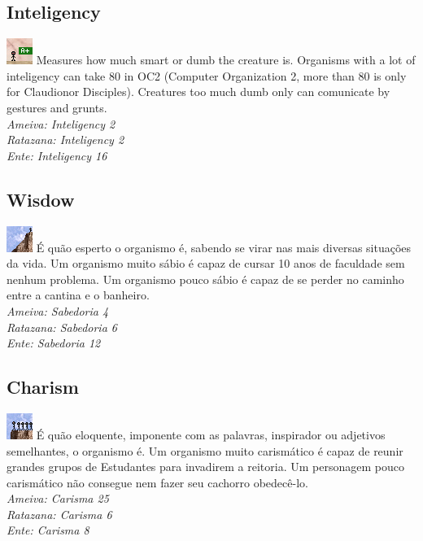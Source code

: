 \documentclass[ letterpaper,12pt]{article}
\begin{document}
\subsection{Inteligency}
\includegraphics{../data/skills/Img/inteligencia.png}
Measures how much smart or dumb the creature is. Organisms with a lot of inteligency can take 80 in OC2 (Computer Organization 2, more than 80 is only for Claudionor Disciples). Creatures too much dumb only can comunicate by gestures and grunts.\\
{\it Ameiva: Inteligency 2\\
Ratazana: Inteligency 2\\
Ente: Inteligency 16\\}

\subsection{Wisdow}
\includegraphics{../data/skills/Img/sabedoria.png}
É quão esperto o organismo é, sabendo se virar nas mais diversas situações da vida. Um organismo muito sábio é capaz de cursar 10 anos de faculdade sem nenhum problema. Um organismo pouco sábio é capaz de se perder no caminho entre a cantina e o banheiro.\\
{\it Ameiva: Sabedoria 4\\
Ratazana: Sabedoria 6\\
Ente: Sabedoria 12}

\subsection{Charism}
\includegraphics{../data/skills/Img/carisma.png}
É quão eloquente, imponente com as palavras, inspirador ou adjetivos semelhantes, o organismo é. Um organismo muito carismático é capaz de reunir grandes grupos de Estudantes para invadirem a reitoria. Um personagem pouco carismático não consegue nem fazer seu cachorro obedecê-lo.\\
{\it Ameiva: Carisma 25\\
Ratazana: Carisma 6\\
Ente: Carisma 8}
\end{document}
